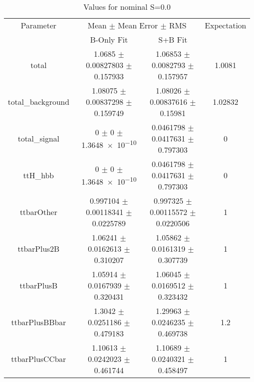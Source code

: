 \begin{table}
\centering
\caption{Values for nominal S=0.0}
\begin{tabular}{cccc}
\toprule
Parameter & \multicolumn{2}{c}{Mean $\pm$ Mean Error $\pm$ RMS} & Expectation\\
 & B-Only Fit & S+B Fit & \\
\midrule
total & \num{1.0685} $\pm$ \num{0.00827803} $\pm$ \num{0.157933} & \num{1.06853} $\pm$ \num{0.0082793} $\pm$ \num{0.157957} & \num{1.0081}\\
total\_background & \num{1.08075} $\pm$ \num{0.00837298} $\pm$ \num{0.159749} & \num{1.08026} $\pm$ \num{0.00837616} $\pm$ \num{0.15981} & \num{1.02832}\\
total\_signal & \num{0} $\pm$ \num{0} $\pm$ \num{1.3648e-10} & \num{0.0461798} $\pm$ \num{0.0417631} $\pm$ \num{0.797303} & \num{0}\\
ttH\_hbb & \num{0} $\pm$ \num{0} $\pm$ \num{1.3648e-10} & \num{0.0461798} $\pm$ \num{0.0417631} $\pm$ \num{0.797303} & \num{0}\\
ttbarOther & \num{0.997104} $\pm$ \num{0.00118341} $\pm$ \num{0.0225789} & \num{0.997325} $\pm$ \num{0.00115572} $\pm$ \num{0.0220506} & \num{1}\\
ttbarPlus2B & \num{1.06241} $\pm$ \num{0.0162613} $\pm$ \num{0.310207} & \num{1.05862} $\pm$ \num{0.0161319} $\pm$ \num{0.307739} & \num{1}\\
ttbarPlusB & \num{1.05914} $\pm$ \num{0.0167939} $\pm$ \num{0.320431} & \num{1.06045} $\pm$ \num{0.0169512} $\pm$ \num{0.323432} & \num{1}\\
ttbarPlusBBbar & \num{1.3042} $\pm$ \num{0.0251186} $\pm$ \num{0.479183} & \num{1.29963} $\pm$ \num{0.0246235} $\pm$ \num{0.469738} & \num{1.2}\\
ttbarPlusCCbar & \num{1.10613} $\pm$ \num{0.0242023} $\pm$ \num{0.461744} & \num{1.10689} $\pm$ \num{0.0240321} $\pm$ \num{0.458497} & \num{1}\\
\bottomrule
\end{tabular}
\end{table}